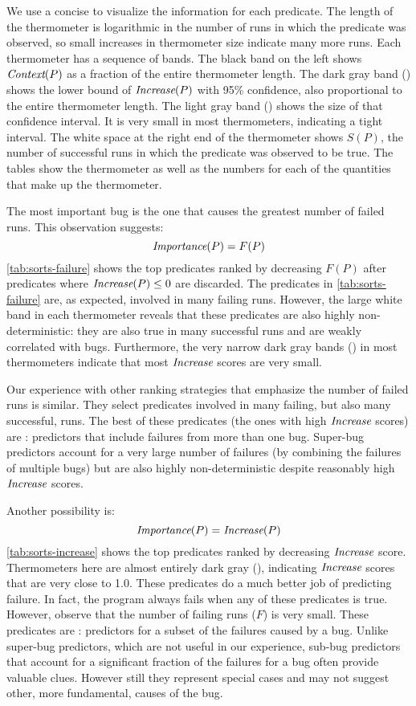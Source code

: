 We use a concise  to visualize the information
for each predicate.  The length of the thermometer is logarithmic in
the number of runs in which the predicate was observed, so small
increases in thermometer size indicate many more runs.  Each
thermometer has a sequence of bands.  The black band on the left shows
$\textit{Context}(P)$ as a fraction of the entire thermometer length.  The
dark gray band () shows the lower bound of $\textit{Increase}(P)$
with 95\% confidence, also proportional to the entire thermometer
length.  The light gray band () shows the size of that
confidence interval.  It is very small in most thermometers,
indicating a tight interval.  The white space at the right end of the
thermometer shows $S(P)$, the number of successful runs in which the
predicate was observed to be true.  The tables show the thermometer as
well as the numbers for each of the quantities that make up the
thermometer.

The most important bug is the one that causes the greatest number of
failed runs.  This observation suggests:
\[ \textit{Importance}(P) = F(P) \]
\autoref{tab:sorts-failure} shows the top predicates ranked by
decreasing $F(P)$ after predicates where $\textit{Increase}(P) \leq 0$ are
discarded.  The predicates in \autoref{tab:sorts-failure} are, as
expected, involved in many failing runs.  However, the large white
band in each thermometer reveals that these predicates are also highly
non-deterministic: they are also true in many successful runs and are
weakly correlated with bugs.  Furthermore, the very narrow dark gray
bands () in most thermometers indicate that most
$\textit{Increase}$ scores are very small.

Our experience with other ranking strategies that emphasize the number
of failed runs is similar.  They select predicates involved in many
failing, but also many successful, runs.  The best of these predicates
(the ones with high $\textit{Increase}$ scores) are : predictors that include failures from more than one
bug.  Super-bug predictors account for a
very large number of failures (by combining the failures of multiple
bugs) but are also highly non-deterministic despite reasonably high
$\textit{Increase}$ scores.

Another possibility is:
\[ \textit{Importance}(P) = \textit{Increase}(P) \]
\autoref{tab:sorts-increase} shows the top predicates ranked by
decreasing $\textit{Increase}$ score.  Thermometers here are almost entirely
dark gray (), indicating $\textit{Increase}$ scores that are very
close to 1.0.  These predicates do a much better job of predicting
failure.  In fact, the program always fails when any of these
predicates is true.  However, observe that the number of failing runs
($F$) is very small.  These predicates are : predictors for a subset of the failures caused by a
bug.  Unlike super-bug predictors, which are not useful in our
experience, sub-bug predictors that account for a significant fraction
of the failures for a bug often provide valuable clues.  However still
they represent special cases and may not suggest other, more
fundamental, causes of the bug.

